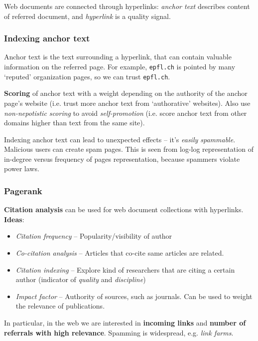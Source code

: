 Web documents are connected through hyperlinks: \emph{anchor text} describes content of referred document, and \emph{hyperlink} is a quality signal.

\subsubsection{Indexing anchor text} %
\label{ssub:indexing_anchor_text}
  Anchor text is the text surrounding a hyperlink, that can contain valuable information on the referred page. For example, \texttt{epfl.ch} is pointed by many `reputed' organization pages, so we can trust \texttt{epfl.ch}.

  \textbf{Scoring} of anchor text with a weight depending on the authority of the anchor page's website (i.e. trust more anchor text from `authorative' websites). Also use \emph{non-nepotistic scoring} to avoid \emph{self-promotion} (i.e. score anchor text from other domains higher than text from the same site).

  Indexing anchor text can lead to unexpected effects -- it's \emph{easily spammable}. Malicious users can create spam pages. This is seen from log-log representation of in-degree versus frequency of pages representation, because spammers violate power laws.

\subsubsection{Pagerank} %
\label{ssub:link_based_ranking_pagerank}
  \textbf{Citation analysis} can be used for web document collections with hyperlinks. \textbf{Ideas}:
  \begin{itemize}
    \item \emph{Citation frequency} -- Popularity/visibility of author
    \item \emph{Co-citation analysis} -- Articles that co-cite same articles are related.
    \item \emph{Citation indexing} -- Explore kind of researchers that are citing a certain author (indicator of \emph{quality} and \emph{discipline})
    \item \emph{Impact factor} -- Authority of sources, such as journals. Can be used to weight the relevance of publications.
  \end{itemize}

  In particular, in the web we are interested in \textbf{incoming links} and \textbf{number of referrals with high relevance}. Spamming is widespread, e.g. \emph{link farms}.

